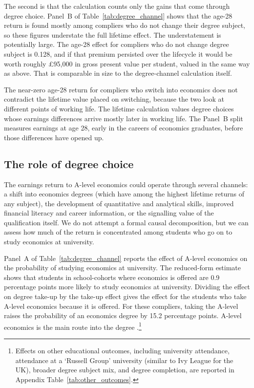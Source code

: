 The second is that the calculation counts only the gains that come through degree choice. Panel~B of Table~\ref{tab:degree_channel} shows that the age-28 return is found mostly among compliers who do not change their degree subject, so these figures understate the full lifetime effect. The understatement is potentially large. The age-28 effect for compliers who do not change degree subject is 0.128, and if that premium persisted over the lifecycle it would be worth roughly \pounds 95,000 in gross present value per student, valued in the same way as above. That is comparable in size to the degree-channel calculation itself.

The near-zero age-28 return for compliers who switch into economics does not contradict the lifetime value placed on switching, because the two look at different points of working life. The lifetime calculation values degree choices whose earnings differences arrive mostly later in working life. The Panel~B split measures earnings at age 28, early in the careers of economics graduates, before those differences have opened up.

\subsection{The role of degree choice}
\label{sec:degree_channel}

The earnings return to A-level economics could operate through several channels: a shift into economics degrees (which have among the highest lifetime returns of any subject), the development of quantitative and analytical skills, improved financial literacy and career information, or the signalling value of the qualification itself. We do not attempt a formal causal decomposition, but we can assess how much of the return is concentrated among students who go on to study economics at university.



Panel~A of Table~\ref{tab:degree_channel} reports the effect of A-level economics on the probability of studying economics at university. The reduced-form estimate shows that students in school-cohorts where economics is offered are 0.9 percentage points more likely to study economics at university. Dividing the effect on degree take-up by the take-up effect gives the effect for the students who take A-level economics because it is offered. For these compliers, taking the A-level raises the probability of an economics degree by 15.2 percentage points. A-level economics is the main route into the degree \citep{advani2020ethnic}.\footnote{Effects on other educational outcomes, including university attendance, attendance at a `Russell Group' university (similar to Ivy League for the UK), broader degree subject mix, and degree completion, are reported in Appendix Table~\ref{tab:other_outcomes}.}

